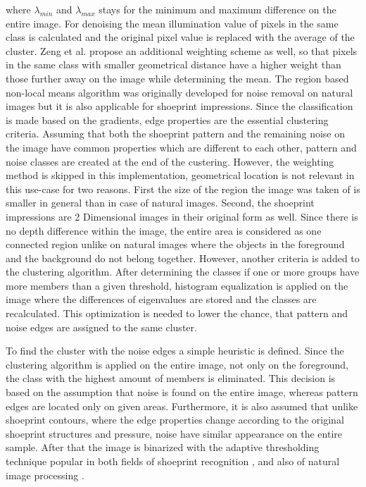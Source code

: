\documentclass[draft,final]{vutinfth} %
\begin{document}
where $\lambda_{min}$ and $\lambda_{max}$ stays for the minimum and maximum difference on the entire image.
For denoising the mean illumination value of pixels in the same class is calculated and the original pixel value is replaced with the average of the cluster.
Zeng et al. \cite{zeng2011region} propose an additional weighting scheme as well, so that pixels in the same class with smaller geometrical distance have a higher weight than those further away on the image while determining the mean.
The region based non-local means algorithm was originally developed for noise removal on natural images but it is also applicable for shoeprint impressions.
Since the classification is made based on the gradients, edge properties are the essential clustering criteria.
Assuming that both the shoeprint pattern and the remaining noise on the image have common properties which are different to each other, pattern and noise classes are created at the end of the custering.
However, the weighting method is skipped in this implementation, geometrical location is not relevant in this use-case for two reasons.
First the size of the region the image was taken of is smaller in general than in case of natural images.
Second, the shoeprint impressions are 2 Dimensional images in their original form as well. 
Since there is no depth difference within the image, the entire area is considered as one connected region unlike on natural images where the objects in the foreground and the background do not belong together.
However, another criteria is added to the clustering algorithm.
After determining the classes if one or more groups have more members than a given threshold, histogram equalization is applied on the image where the differences of eigenvalues are stored and the classes are recalculated.
This optimization is needed to lower the chance, that pattern and noise edges are assigned to the same cluster. 
\par
To find  the cluster with the noise edges a simple heuristic is defined.
Since the clustering algorithm is applied on the entire image, not only on the foreground, the class with the highest amount of members is eliminated.
This decision is based on the assumption that noise is found on the entire image, whereas pattern edges are located only on given areas.
Furthermore, it is also assumed that unlike shoeprint contours, where the edge properties change according to the original shoeprint structures and pressure, noise have similar appearance on the entire sample.
After that the image is binarized with the adaptive thresholding technique \cite{laine1996multiscale} popular in both fields of shoeprint recognition  \cite{wang2014automatic}, \cite{li2014retrieval} and also of natural image processing \cite{xu2016image}.
\end{document}
